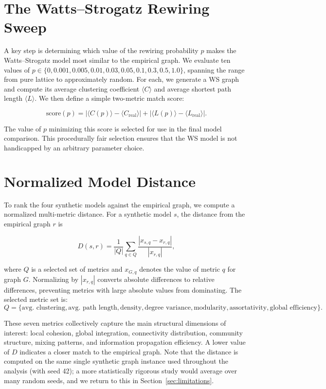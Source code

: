 \documentclass[12pt,a4paper]{report}
\begin{document}
\section{The Watts--Strogatz Rewiring Sweep}
\label{sec:ws-sweep}

A key step is determining which value of the rewiring probability $p$ makes the Watts--Strogatz model most similar to the empirical graph. We evaluate ten values of $p \in \{0, 0.001, 0.005, 0.01, 0.03, 0.05, 0.1, 0.3, 0.5, 1.0\}$, spanning the range from pure lattice to approximately random. For each, we generate a WS graph and compute its average clustering coefficient $\langle C \rangle$ and average shortest path length $\langle L \rangle$. We then define a simple two-metric match score:

\begin{equation}
\text{score}(p) = |\langle C(p) \rangle - \langle C_{\text{real}} \rangle| + |\langle L(p) \rangle - \langle L_{\text{real}} \rangle|.
\end{equation}

The value of $p$ minimizing this score is selected for use in the final model comparison. This procedurally fair selection ensures that the WS model is not handicapped by an arbitrary parameter choice.

\section{Normalized Model Distance}
\label{sec:model-distance}

To rank the four synthetic models against the empirical graph, we compute a normalized multi-metric distance. For a synthetic model $s$, the distance from the empirical graph $r$ is

\begin{equation}
D(s, r) = \frac{1}{|Q|} \sum_{q \in Q} \frac{|x_{s,q} - x_{r,q}|}{|x_{r,q}|},
\end{equation}

where $Q$ is a selected set of metrics and $x_{G,q}$ denotes the value of metric $q$ for graph $G$. Normalizing by $|x_{r,q}|$ converts absolute differences to relative differences, preventing metrics with large absolute values from dominating. The selected metric set is:
\[
Q = \{\text{avg. clustering}, \text{avg. path length}, \text{density}, \text{degree variance}, \text{modularity}, \text{assortativity}, \text{global efficiency}\}.
\]

These seven metrics collectively capture the main structural dimensions of interest: local cohesion, global integration, connectivity distribution, community structure, mixing patterns, and information propagation efficiency. A lower value of $D$ indicates a closer match to the empirical graph. Note that the distance is computed on the same single synthetic graph instance used throughout the analysis (with seed 42); a more statistically rigorous study would average over many random seeds, and we return to this in Section~\ref{sec:limitations}.
\end{document}
